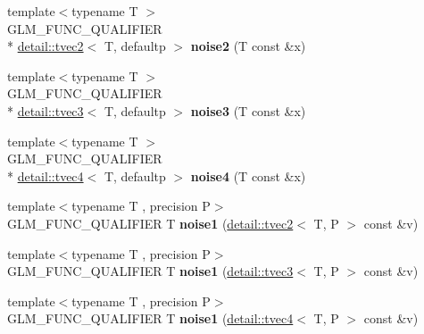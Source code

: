 \begin{DoxyCompactItemize}
\item 
\hypertarget{namespaceglm_a934f962ac6c9780c1b9aa7f0b2c36cfc}{{\footnotesize template$<$typename T $>$ }\\G\-L\-M\-\_\-\-F\-U\-N\-C\-\_\-\-Q\-U\-A\-L\-I\-F\-I\-E\-R \\*
\hyperlink{structglm_1_1detail_1_1tvec2}{detail\-::tvec2}$<$ T, defaultp $>$ {\bfseries noise2} (T const \&x)}\label{namespaceglm_a934f962ac6c9780c1b9aa7f0b2c36cfc}

\item 
\hypertarget{namespaceglm_a195da32ebfea1c706a6a7e5a08838575}{{\footnotesize template$<$typename T $>$ }\\G\-L\-M\-\_\-\-F\-U\-N\-C\-\_\-\-Q\-U\-A\-L\-I\-F\-I\-E\-R \\*
\hyperlink{structglm_1_1detail_1_1tvec3}{detail\-::tvec3}$<$ T, defaultp $>$ {\bfseries noise3} (T const \&x)}\label{namespaceglm_a195da32ebfea1c706a6a7e5a08838575}

\item 
\hypertarget{namespaceglm_a034c132519dcf2e11725910dbfd466ce}{{\footnotesize template$<$typename T $>$ }\\G\-L\-M\-\_\-\-F\-U\-N\-C\-\_\-\-Q\-U\-A\-L\-I\-F\-I\-E\-R \\*
\hyperlink{structglm_1_1detail_1_1tvec4}{detail\-::tvec4}$<$ T, defaultp $>$ {\bfseries noise4} (T const \&x)}\label{namespaceglm_a034c132519dcf2e11725910dbfd466ce}

\item 
\hypertarget{namespaceglm_a6efe792fcb5730d715e2876db85e1e54}{{\footnotesize template$<$typename T , precision P$>$ }\\G\-L\-M\-\_\-\-F\-U\-N\-C\-\_\-\-Q\-U\-A\-L\-I\-F\-I\-E\-R T {\bfseries noise1} (\hyperlink{structglm_1_1detail_1_1tvec2}{detail\-::tvec2}$<$ T, P $>$ const \&v)}\label{namespaceglm_a6efe792fcb5730d715e2876db85e1e54}

\item 
\hypertarget{namespaceglm_a61a2448910dff94fb4b05826f8a49fbe}{{\footnotesize template$<$typename T , precision P$>$ }\\G\-L\-M\-\_\-\-F\-U\-N\-C\-\_\-\-Q\-U\-A\-L\-I\-F\-I\-E\-R T {\bfseries noise1} (\hyperlink{structglm_1_1detail_1_1tvec3}{detail\-::tvec3}$<$ T, P $>$ const \&v)}\label{namespaceglm_a61a2448910dff94fb4b05826f8a49fbe}

\item 
\hypertarget{namespaceglm_a8cd64bc969898037123e36a45f56a330}{{\footnotesize template$<$typename T , precision P$>$ }\\G\-L\-M\-\_\-\-F\-U\-N\-C\-\_\-\-Q\-U\-A\-L\-I\-F\-I\-E\-R T {\bfseries noise1} (\hyperlink{structglm_1_1detail_1_1tvec4}{detail\-::tvec4}$<$ T, P $>$ const \&v)}\label{namespaceglm_a8cd64bc969898037123e36a45f56a330}


\end{DoxyCompactItemize}
